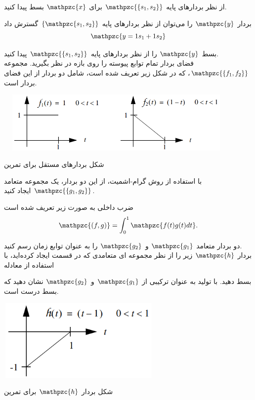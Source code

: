 \documentclass[a4paper,12pt]{report}
\begin{document}
	   \textbf{}
	   از نظر بردارهای پایه $ \mathpzc{\{s_1,s_2\}} $ برای $ \mathpzc{x} $ بسط پیدا کنید.
	   
	   \textbf{}
	   بردار $ \mathpzc{y} $ را می‌توان از نظر بردارهای پایه 
	   $ \{\mathpzc{s_1,s_2}\} $
	    گسترش داد
	    $$
	    \mathpzc{y=1s_1+1s_2}
	    $$
	    
	    بسط $ \mathpzc{y} $ را از نظر بردارهای پایه $ \mathpzc{\{s_1,s_2\}} $ پیدا کنید.\\
	    
	    \hspace{-2.5cm}\textbf{}\hspace{0.6cm}
	    فضای بردار تمام توابع پیوسته را روی بازه \lr{[0,1]} در نظر بگیرید. مجموعه $ \mathpzc{\{f_1,f_2\}} $، که در شکل زیر تعریف شده است، شامل دو بردار از این فضای بردار است.
	    \begin{center}
	    	\includegraphics[width=12cm, height=3cm]{153-1}
	    	
	    	شکل  بردارهای مستقل برای تمرین 
	    \end{center}
    
    \textbf{}
    با استفاده از روش گرام-اشمیت، از این دو بردار، یک مجموعه متعامد 
    $ \mathpzc{\{g_1,g_2\}} $
     ایجاد کنید.
     
     \hspace{0.3cm}
      ضرب داخلی به صورت زیر تعریف شده است
     $$
     \mathpzc{(f,g)}=\int_{0}^{1}\mathpzc{f(t)g(t)dt}.
     $$
     
     دو بردار متعامد $ \mathpzc{g_1} $ و $ \mathpzc{g_2} $ را به عنوان توابع زمان رسم کنید.\\
     
     \textbf{}
     بردار $ \mathpzc{h} $ زیر را از نظر مجموعه ای متعامدی که در قسمت  ایجاد کرده‌اید، با استفاده از معادله
     
     \hspace{0.3cm}
       بسط دهید. با تولید  به عنوان ترکیبی از $ \mathpzc{g_1} $ و $ \mathpzc{g_2} $ نشان دهید که بسط درست است.
     \begin{center}
     	\includegraphics[width=8cm, height=4cm]{153-2}
     	
     	شکل  بردار $ \mathpzc{h} $ برای تمرین 
     \end{center}
 
\end{document}
